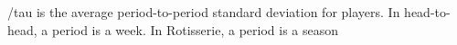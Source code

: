 \documentclass[preview]{standalone}
\begin{document}
\begin{center}
/tau is the average period-to-period standard deviation for players. 
In head-to-head, a period is a week. In Rotisserie, a period is a season
\end{center}
\end{document}
